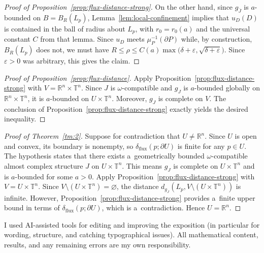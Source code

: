 \documentclass[10pt,a4paper]{amsart}
\numberwithin{equation}{section}
\newcommand{\bR}{{\mathbb R}}
\newcommand{\bT}{{\mathbb T}}
\theoremstyle{definition}
\begin{document}
\begin{proof}[Proof of Proposition~\ref{prop:flux-distance-strong}]
On the other hand, since $g_{\overline{J}}$ is $a$-bounded on $B=B_R(L_p)$, Lemma~\ref{lem:local-confinement} implies that $u_D(D)$ is contained in the ball of radius  about $L_p$, with $r_0=r_0(a)$ and the universal constant $C$ from that lemma. Since $u_D$ meets $\mu_P^{-1}(\partial P)$ while, by construction, $B_R(L_p)$ does not, we must have $R\le\rho\le C(a)\max\bigl(\delta+\varepsilon,\sqrt{\delta+\varepsilon}\bigr)$.
Since $\varepsilon>0$ was arbitrary, this gives the claim.
\end{proof}

\begin{proof}[Proof of Proposition~\ref{prop:flux-distance}]
Apply Proposition~\ref{prop:flux-distance-strong} with $V = \bR^n\times\bT^n$. Since $J$ is $\omega$-compatible and $g_J$ is $a$-bounded globally on $\bR^n\times\bT^n$, it is $a$-bounded on $U\times\bT^n$. Moreover, $g_J$ is complete on $V$. The conclusion of Proposition~\ref{prop:flux-distance-strong} exactly yields the desired inequality.
\end{proof}

\begin{proof}[Proof of Theorem~\ref{tm:2}]
Suppose for contradiction that $U\neq \bR^n$. Since $U$ is open and convex, its boundary is nonempty, so $\delta_{\mathrm{flux}}(p;\partial U)$ is finite for any $p\in U$.
The hypothesis states that there exists a~geometrically bounded $\omega$-compatible almost complex structure $J$ on $U\times\bT^n$. This means $g_J$ is complete on $U\times\bT^n$ and is $a$-bounded for some $a>0$.
Apply Proposition~\ref{prop:flux-distance-strong} with~${V = U\times\bT^n}$. Since $V\setminus (U\times\bT^n) = \varnothing$, the distance $d_{g_J}(L_p, V\setminus (U\times\bT^n))$ is infinite. However, Proposition~\ref{prop:flux-distance-strong} provides a~finite upper bound in terms of $\delta_{\mathrm{flux}}(p;\partial U)$, which is a~contradiction. Hence $U=\bR^n$.
\end{proof}

I used AI-assisted tools for editing and improving the exposition (in particular for wording, structure, and catching typographical issues).
All mathematical content, results, and any remaining errors are my own responsibility.
\end{document}
